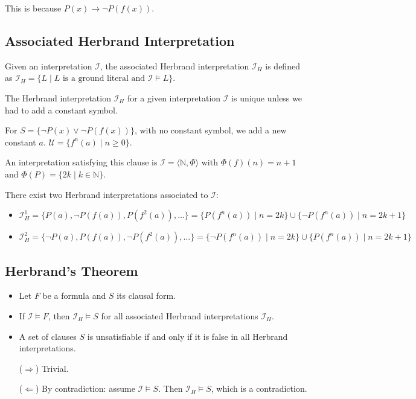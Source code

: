 \documentclass[11pt,a4paper]{article}
\theoremstyle{definition}
\theoremstyle{plain}
\theoremstyle{remark}
\begin{document}
This is because $P(x) \rightarrow \neg P(f(x))$.



\subsection{Associated Herbrand Interpretation}

Given an interpretation $\mathcal{I}$, the associated Herbrand interpretation $\mathcal{I}_H$ is defined as $\mathcal{I}_H = \{ L \mid L \text{ is a ground literal and } \mathcal{I} \models L \}$.

The Herbrand interpretation $\mathcal{I}_H$ for a given interpretation $\mathcal{I}$ is unique unless we had to add a constant symbol.



For $S = \{ \neg P(x) \vee \neg P(f(x)) \}$, with no constant symbol, we add a new constant $a$. $\mathcal{U} = \{f^n(a) \mid n \ge 0\}$.

An interpretation satisfying this clause is $\mathcal{I} = \langle \mathbb{N}, \Phi \rangle$ with $\Phi(f)(n) = n+1$ and $\Phi(P) = \{2k \mid k \in \mathbb{N} \}$.

There exist two Herbrand interpretations associated to $\mathcal{I}$:

\begin{itemize}

    \item $\mathcal{I}_H^1 = \{ P(a), \neg P(f(a)), P(f^2(a)), \dots \} = \{ P(f^n(a)) \mid n=2k \} \cup \{ \neg P(f^n(a)) \mid n=2k+1 \}$

    \item $\mathcal{I}_H^2 = \{ \neg P(a), P(f(a)), \neg P(f^2(a)), \dots \} = \{ \neg P(f^n(a)) \mid n=2k \} \cup \{ P(f^n(a)) \mid n=2k+1 \}$

\end{itemize}



\subsection{Herbrand's Theorem}

\begin{itemize}

    \item Let $F$ be a formula and $S$ its clausal form.

    \item If $\mathcal{I} \models F$, then $\mathcal{I}_H \models S$ for all associated Herbrand interpretations $\mathcal{I}_H$.

    \item A set of clauses $S$ is unsatisfiable if and only if it is false in all Herbrand interpretations.

    ($\Rightarrow$) Trivial.

    ($\Leftarrow$) By contradiction: assume $\mathcal{I} \models S$. Then $\mathcal{I}_H \models S$, which is a contradiction.

\end{itemize}
\end{document}

